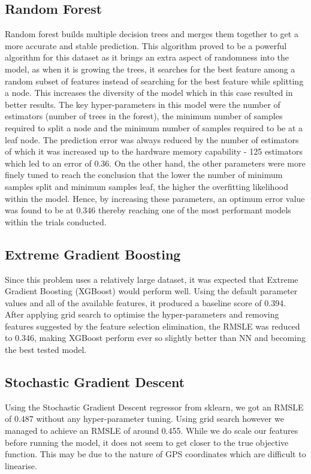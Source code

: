 \documentclass[a4paper]{article}
\begin{document}
\subsection{Random Forest}
Random forest builds multiple decision trees and merges them together to get a
more accurate and stable prediction. This algorithm proved to be a powerful
algorithm for this dataset as it brings an extra aspect of randomness into the
model, as when it is growing the trees, it searches for the best feature among a
random subset of features instead of searching for the best feature while
splitting a node. This increases the diversity of the model which in this case
resulted in better results. The key hyper-parameters in this model were the
number of estimators (number of trees in the forest), the minimum number of
samples required to split a node and the minimum number of samples required to
be at a leaf node. The prediction error was always reduced by the number of
estimators of which it was increased up to the hardware memory capability - 125
estimators which led to an error of 0.36. On the other hand, the other
parameters were more finely tuned to reach the conclusion that the lower the
number of minimum samples split and minimum samples leaf, the higher the
overfitting likelihood within the model. Hence, by increasing these parameters,
an optimum error value was found to be at 0.346 thereby reaching one of the most
performant models within the trials conducted.

\subsection{Extreme Gradient Boosting}
Since this problem uses a relatively large dataset, it was expected that Extreme
Gradient Boosting (XGBoost) would perform well. Using the default parameter
values and all of the available features, it produced a baseline score of 0.394.
After applying grid search to optimise the hyper-parameters and removing features
suggested by the feature selection elimination, the RMSLE was reduced to 0.346,
making XGBoost perform ever so slightly better than NN and becoming the best
tested model.

\subsection{Stochastic Gradient Descent}
Using the Stochastic Gradient Descent regressor from sklearn, we got an RMSLE of
0.487 without any hyper-parameter tuning. Using grid search however we managed to
achieve an RMSLE of around 0.455. While we do scale our features before running
the model, it does not seem to get closer to the true objective function. This
may be due to the nature of GPS coordinates which are difficult to linearise.
\end{document}

